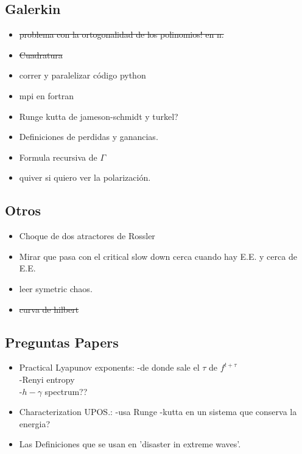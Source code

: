 	\subsection{Galerkin}
		
		\begin{itemize}
			\color{red}	
			\item \st{problema con la ortogonalidad de los polinomios! en n.}
			\item \st{Cuadratura}
			\item correr y paralelizar código python
			\item mpi en fortran
			\item Runge kutta de jameson-schmidt y turkel?
			\item Definiciones de perdidas y ganancias. 
			\item Formula recursiva de $\Gamma$
			\item quiver si quiero ver la polarización.
		\end{itemize}
		
	\subsection{Otros}
		\begin{itemize}
			\color{red}	
			\item Choque de dos atractores de Rossler
			\item Mirar que pasa con el critical slow down cerca cuando hay E.E. y cerca de E.E.
			\item leer symetric chaos.
			\item \st{curva de hilbert}
		\end{itemize}
				
	\subsection{Preguntas Papers}
		\begin{itemize}
			\color{red}	
			\item Practical Lyapunov exponents: -de donde sale el $\tau $ de $f^{t+\tau}$\\
												-Renyi entropy\\
												-$h-\gamma$ spectrum??
			\item Characterization UPOS.: -usa Runge -kutta en un sistema que conserva la energia?
			\item Las Definiciones que se usan en 'disaster in extreme waves'. 
			\end{itemize}